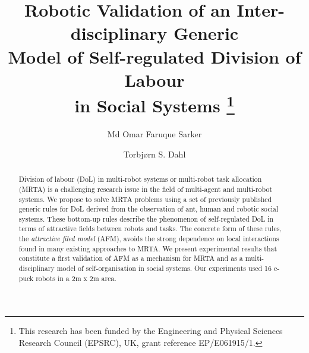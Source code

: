 \documentclass{llncs}
\begin{document}
\title{Robotic Validation of an Inter-disciplinary Generic\\
Model of Self-regulated Division of Labour\\ in Social Systems
\thanks{This research has been funded by the Engineering and Physical Sciences Research Council (EPSRC), UK, grant reference EP/E061915/1.}
}
\author{Md Omar Faruque Sarker \and
Torbj{\o}rn S. Dahl %
}
\maketitle
\begin{abstract}
Division of labour (DoL) in multi-robot systems or multi-robot task allocation (MRTA) is a challenging research issue in the field of multi-agent and multi-robot systems.
We propose to solve MRTA problems using a set of previously published generic rules for DoL derived from the observation of ant, human and robotic social systems.
These bottom-up rules describe the phenomenon of self-regulated DoL in terms of attractive fields between robots and tasks.
The concrete form of these rules, the \textit{attractive filed model} (AFM), avoids the strong dependence on local interactions found in many existing approaches to MRTA.
We present experimental results that constitute a first validation of AFM as a mechanism for MRTA and as a multi-disciplinary model of self-organisation in social systems.
Our experiments used 16 e-puck robots in a 2m x 2m area.
\end{abstract}
\end{document}
